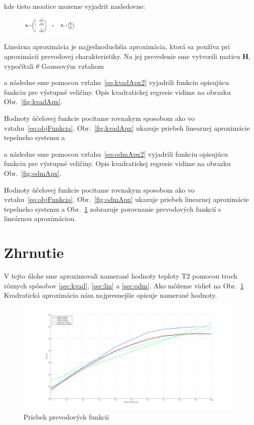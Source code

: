 \documentclass{article}
\begin{document}
kde tieto moatice mozeme vyjadrit nasledovne:

\begin{figure}[!htbp]
	\begin{center}
		\includegraphics[width=0.25\textwidth]{include/defHandTheta3.png}
	\end{center}
\end{figure}

Lineárna aproximácia je najjednoduchšia aproximácia, ktorá sa používa pri aproximácii prevodovej
charakteristiky. Na jej prevedenie sme vytvorili maticu \textbf{H}, vypočítali
\(\theta\) Gaussovým vzťahom

a následne sme pomocou vzťahu~\ref{eq:kvadApx2} vyjadrili funkciu opisujúcu funkciu pre výstupné
veličiny. Opis kvadratickej regresie vidime na obrazku Obr.~\ref{fig:kvadApx}.

Hodnoty účelovej funkcie pocitame rovnakym sposobom ako vo vztahu~\ref{eq:objFunkcia}.
Obr.~\ref{fig:kvadApx} ukazuje priebeh linearnej aproximácie tepelneho systemu a

a následne sme pomocou vzťahu~\ref{eq:odmApx2} vyjadrili funkciu opisujúcu funkciu pre výstupné
veličiny. Opis kvadratickej regresie vidime na obrazku Obr.~\ref{fig:odmApx}.

Hodnoty účelovej funkcie pocitame rovnakym sposobom ako vo vztahu~\ref{eq:objFunkcia}.
Obr.~\ref{fig:odmApx} ukazuje priebeh linearnej aproximácie tepelneho systemu a
Obr.~\ref{fig:prevod} zobrazuje porovnanie prevodových funkcií s lineárnou aproximáciou.
\clearpage

\section{Zhrnutie}
\label{sec:zhrnutie}

V tejto úlohe sme aproximovali namerané hodnoty teploty T2 pomocou troch rôznych spôsobov \ref{sec:kvad}, \ref{sec:lin} a \ref{sec:odm}.
Ako môžeme vidieť na Obr.~\ref{fig:prevod} Kvadratická aproximácia nám najpresnejšie opisuje namerané hodnoty.

\begin{figure}[!htbp]
	\begin{center}
		\includegraphics[width=\textwidth]{./include/prevodove_funkcie2.png}
		\caption{Priebeh prevodových funkcii}
		\label{fig:prevod}
	\end{center}
	\hfill
\end{figure}
\end{document}
